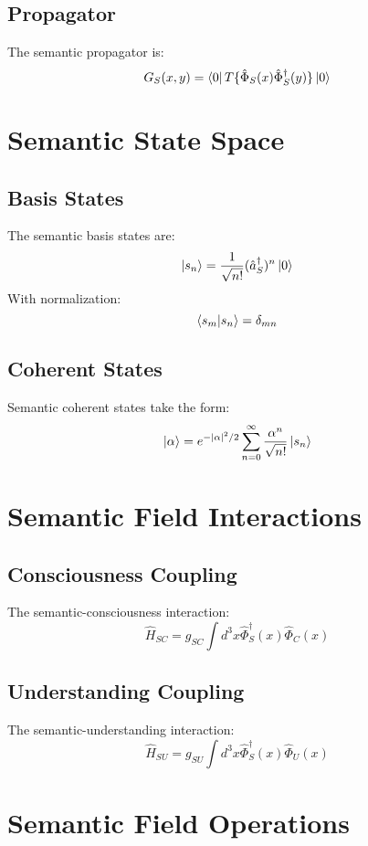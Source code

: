 \documentclass[12pt]{article}
\begin{document}
\subsection{Propagator}
The semantic propagator is:
\begin{equation}
G_S(x,y) = \bra{0}T\{\hat{\Phi}_S(x)\hat{\Phi}_S^\dagger(y)\}\ket{0}
\end{equation}
\section{Semantic State Space}
\subsection{Basis States}
The semantic basis states are:
\begin{equation}
\ket{s_n} = \frac{1}{\sqrt{n!}}(\hat{a}_S^\dagger)^n\ket{0}
\end{equation}
With normalization:
\begin{equation}
\braket{s_m|s_n} = \delta_{mn}
\end{equation}
\subsection{Coherent States}
Semantic coherent states take the form:
\begin{equation}
\ket{\alpha} = e^{-|\alpha|^2/2}\sum_{n=0}^\infty \frac{\alpha^n}{\sqrt{n!}}\ket{s_n}
\end{equation}
\section{Semantic Field Interactions}
\subsection{Consciousness Coupling}
The semantic-consciousness interaction:
\begin{equation}
\hat{H}_{SC} = g_{SC}\int d^3x \hat{\Phi}_S^\dagger(x)\hat{\Phi}_C(x)
\end{equation}
\subsection{Understanding Coupling}
The semantic-understanding interaction:
\begin{equation}
\hat{H}_{SU} = g_{SU}\int d^3x \hat{\Phi}_S^\dagger(x)\hat{\Phi}_U(x)
\end{equation}
\section{Semantic Field Operations}
\end{document}
